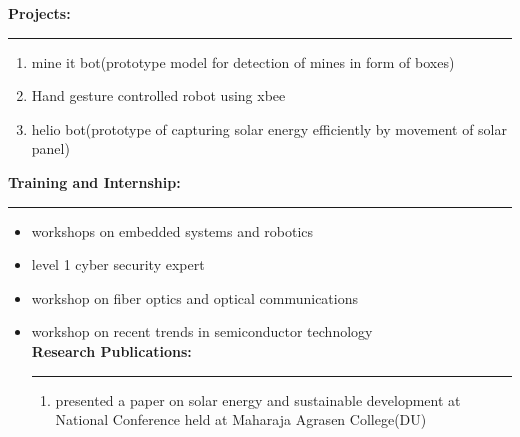 \documentclass[a4paper,10pt]{article}
\begin{document}
\begin{flushleft}
		\bigskip
    \textbf{Projects:}\\
    \hrule
	\smallskip
      \begin{enumerate}
      	\item  mine it bot(prototype model for detection of mines in form of boxes)
      	\item  Hand gesture controlled robot using xbee
      	\item  helio bot(prototype of capturing solar energy efficiently by movement of solar panel) 
      \end{enumerate}
      \textbf{Training and Internship:}\\
  \hrule
   \begin{itemize}
   	\item  workshops on embedded systems and robotics\\
   	\item  level 1 cyber security expert\\
   	\item  workshop on fiber optics and optical communications\\
   	\item  workshop on recent trends in semiconductor technology\\
   	\bigskip
   	\textbf{Research Publications:}\\
   	\medskip
  \hrule
 
  \begin{enumerate}
   \item  presented a paper on solar energy and sustainable development at National Conference held at Maharaja Agrasen College(DU)\\ \medskip
   \end{enumerate}
   \end{itemize}
	\end{flushleft}
	
\end{document}

